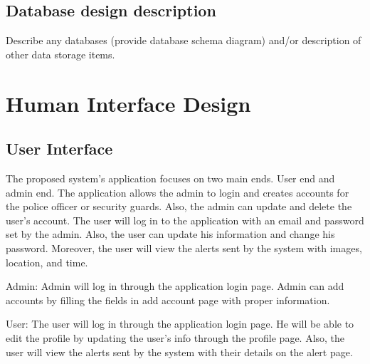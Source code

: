 \documentclass[12pt]{article}
\begin{document}
\subsection{Database design description}
Describe any databases (provide database schema diagram) and/or description of other data storage items.

\section{Human Interface Design}
\label{hid}
\subsection {User Interface}
The proposed system's application focuses on two main ends. User end and admin end. The application allows the admin to login and creates accounts for the police officer or security guards. Also, the admin can update and delete the user's account. The user will log in to the application with an email and password set by the admin. Also, the user can update his information and change his password. Moreover, the user will view the alerts sent by the system with images, location, and time.

Admin: Admin will log in through the application login page. Admin can add accounts by filling the fields in add account page with proper information.

User: The user will log in through the application login page. He will be able to edit the profile by updating the user's info through the profile page. Also, the user will view the alerts sent by the system with their details on the alert page.
\end{document}

